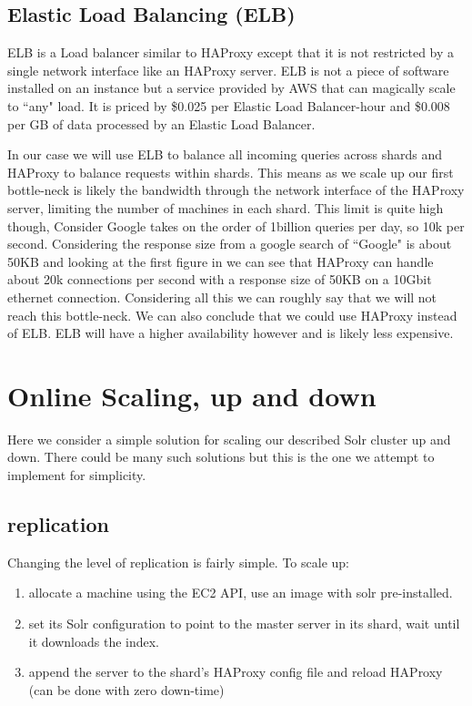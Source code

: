 \documentclass{article}
\begin{document}
\subsection{Elastic Load Balancing (ELB)}
ELB is a Load balancer similar to HAProxy except that it is not
restricted by a single network interface like an HAProxy server. ELB
is not a piece of software installed on an instance but a service
provided by AWS that can magically scale to ``any" load. It is priced
by \$0.025 per Elastic Load Balancer-hour and \$0.008 per GB of data
processed by an Elastic Load Balancer.

In our case we will use ELB to balance all incoming queries across
shards and HAProxy to balance requests within shards. This means as we
scale up our first bottle-neck is likely the bandwidth through the
network interface of the HAProxy server, limiting the number of
machines in each shard. This limit is quite high though, Consider
Google takes on the order of 1billion queries per day\cite{googleTP},
so 10k per second. Considering the response size from a google search
of ``Google" is about 50KB and looking at the first figure in
\cite{10GbHAProxy} we can see that HAProxy can handle about 20k
connections per second with a response size of 50KB on a 10Gbit
ethernet connection. Considering all this we can roughly say that we
will not reach this bottle-neck. We can also conclude that we could
use HAProxy instead of ELB. ELB will have a higher availability
however and is likely less expensive.

\section{Online Scaling, up and down}
Here we consider a simple solution for scaling our described Solr
cluster up and down. There could be many such solutions but this is
the one we attempt to implement for simplicity.

\subsection{replication}
Changing the level of replication is fairly simple. To scale up:

\begin{enumerate}
\item allocate a machine using the EC2 API, use an image with solr pre-installed.
\item set its Solr configuration to point to the master server in its
  shard, wait until it downloads the index.
\item append the server to the shard's HAProxy config file and reload
  HAProxy (can be done with zero down-time)
\end{enumerate}
\end{document}
